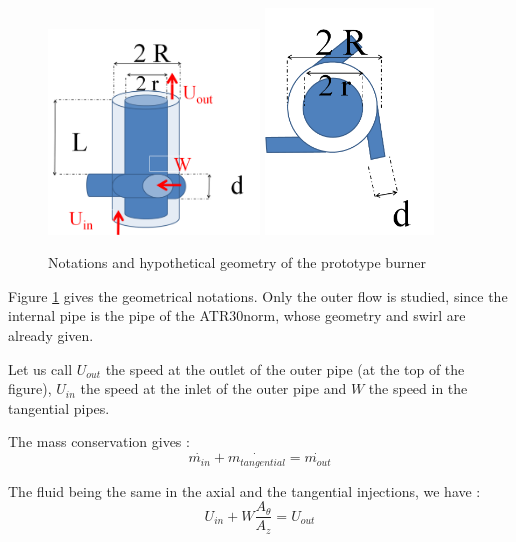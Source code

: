 \begin{figure}[h!]
  \centering
\includegraphics[width=0.50\textwidth]{fig/Proto.png}
\includegraphics[width=0.40\textwidth]{fig/proto_dessus.png}
  \caption{Notations and hypothetical geometry of the prototype burner}
 \label{proto_pipe}
\end{figure}
Figure \ref{proto_pipe} gives the geometrical notations. Only the outer flow is studied, since the internal pipe is the pipe of the ATR30norm, whose geometry and swirl are already given.

Let us call $U_{out}$ the speed at the outlet of the outer pipe (at the top of the figure), $U_{in}$ the speed at the inlet of the outer pipe and $W$ the speed in the tangential pipes.

The mass conservation gives :
\begin{equation}
\dot{m_{in}}+\dot{m_{tangential}}=\dot{m_{out}}
\end{equation}


The fluid being the same in the axial and the tangential injections, we have :
\begin{equation}
U_{in}+W \frac{A_{\theta}}{A_{z}}=U_{out}
\end{equation}


